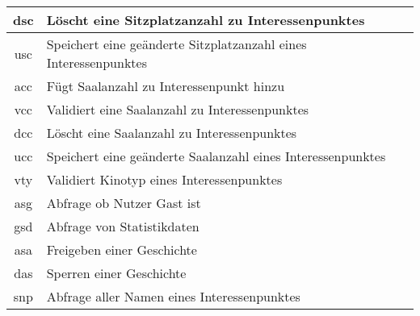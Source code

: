 \begin{longtable}[H]{|c|p{12cm}|}
		dsc                 & Löscht eine Sitzplatzanzahl zu Interessenpunktes                                                                                                   \\ \hline
		usc                 & Speichert eine geänderte Sitzplatzanzahl eines Interessenpunktes                                                                                   \\ \hline
		acc                 & Fügt Saalanzahl zu Interessenpunkt hinzu                                                                                                           \\ \hline
		vcc                 & Validiert eine Saalanzahl zu Interessenpunktes                                                                                                     \\ \hline
		dcc                 & Löscht eine Saalanzahl zu Interessenpunktes                                                                                                        \\ \hline
		ucc                 & Speichert eine geänderte Saalanzahl eines Interessenpunktes                                                                                        \\ \hline
		vty                 & Validiert Kinotyp eines Interessenpunktes                                                                                                          \\ \hline
		asg                 & Abfrage ob Nutzer Gast ist                                                                                                                         \\ \hline
		gsd                 & Abfrage von Statistikdaten                                                                                                                         \\ \hline
		asa                 & Freigeben einer Geschichte                                                                                                                         \\ \hline
		das                 & Sperren einer Geschichte                                                                                                                           \\ \hline
		snp                 & Abfrage aller Namen eines Interessenpunktes                                                                                                        \\ \hline

\end{longtable}
